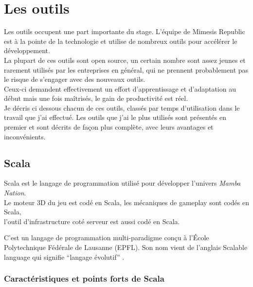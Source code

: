 \chapter{Les outils}       
Les outils occupent une part importante du stage.
L'équipe de Mimesis Republic est à la pointe de la technologie et utilise de
nombreux outils pour accélérer le développement.\\
La plupart de ces outils sont open source, un certain nombre sont assez jeunes
et rarement utilisés par les entreprises en général, qui ne prennent
probablement pas le risque de s'engager avec des nouveaux outils.\\ 
Ceux-ci demandent effectivement un effort d'apprentissage et d'adaptation au
début mais une fois maîtrisés, le gain de productivité est réel.\\

Je décris ci dessous chacun de ces outils,
classés par temps d'utilisation dans le travail que j'ai effectué.
Les outils que j'ai le plus utilisés sont présentés en premier et sont décrits
de façon plus complète, avec leurs avantages et inconvénients.

\section{Scala}
Scala est le langage de programmation utilisé pour développer l'univers \textit{Mamba
  Nation}.\\
Le moteur 3D du jeu est codé en Scala, les mécaniques de gameplay sont codés en
Scala,\\
l'outil d'infrastructure coté serveur est aussi codé en Scala.

C'est un langage de programmation multi-paradigme conçu à l'École Polytechnique
Fédérale de Lausanne (EPFL).
Son nom vient de l'anglais Scalable language qui signifie  ``langage évolutif''
. 

\subsection{Caractéristiques et points forts de Scala}

